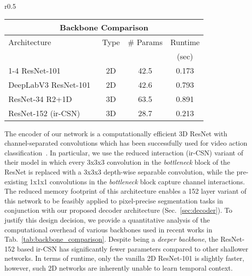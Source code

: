 \documentclass{bmvc2k}
\begin{document}
\begin{wraptable}{r}{0.5\textwidth}
\centering
\scriptsize
{}
\setlength{\tabcolsep}{5px}\vspace{-10pt}
\begin{tabular}{|l|c|c|c|}
\toprule
 \multicolumn{4}{c}{Backbone Comparison} \\
 \midrule
 Architecture & Type & \# Params            & Runtime \\
              &      &  & (sec)     \\
\cmidrule(lr){1-4}
ResNet-101~\cite{He16CVPR}                     & 2D & 42.5 & 0.173 \\
DeepLabV3 ResNet-101~\cite{Chen17ARXIV}        & 2D & 42.6 & 0.793 \\
ResNet-34 R2+1D ~\cite{Tran18CVPR} & 3D & 63.5 & 0.891 \\
ResNet-152 (ir-CSN)~\cite{Tran19ICCV}    & 3D & 28.7 & 0.213 \\
\bottomrule
\end{tabular}
\caption{Comparison of various backbones. Runtime is for generating feature maps for an 8-frame clip with  resolution on an Nvidia GTX-1080Ti. : lower stride~\cite{Hou19BMVC}} 
\vspace{-2mm}
\label{tab:backbone_comparison}
\end{wraptable} 
The encoder of our network is a computationally efficient 3D ResNet with channel-separated convolutions which has been successfully used for video action classification~\cite{Tran19ICCV}. In particular, we use the reduced interaction (ir-CSN) variant of their model in which every 3x3x3 convolution in the \textit{bottleneck} block of the ResNet is replaced with a 3x3x3 depth-wise separable convolution, while the pre-existing 1x1x1 convolutions in the \textit{bottleneck} block capture channel interactions. The reduced memory footprint of this architecture enables a 152 layer variant of this network to be feasibly applied to pixel-precise segmentation tasks in conjunction with our proposed decoder architecture (Sec.~\ref{sec:decoder}). 
To justify this design decision, we provide a quantitative analysis of the computational overhead of various backbones used in recent works in Tab.~\ref{tab:backbone_comparison}. 
Despite being a \textit{deeper backbone}, the ResNet-152 based ir-CSN has significantly fewer parameters compared to other shallower networks. In terms of runtime, only the vanilla 2D ResNet-101 is slightly faster, however, such 2D networks are inherently unable to learn temporal context. 
\end{document}

